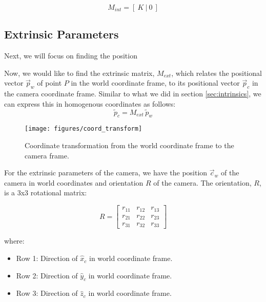 \begin{equation}
    M_{int} = \left[\: K \:\vert\: 0 \:\right]
\end{equation}

\subsection{Extrinsic Parameters} \label{sec:extrinsics}

Next, we will focus on finding the position 

Now, we would like to find the extrinsic matrix, $M_{ext}$, which relates the positional vector $\vec{p}_w$ of point $P$ in the world coordinate frame, to its positional vector $\vec{p}_c$ in the camera coordinate frame. Similar to what we did in section \ref{sec:intrinsics}, we can express this in homogenous coordinates as follows:
\begin{equation} \label{eq:pc}
    \widetilde{p}_c =  M_{ext}\,\widetilde{p}_w
\end{equation}

\begin{figure}[H]
    \centering
    \texttt{[image: figures/coord\_transform]}
    \caption{Coordinate transformation from the world coordinate frame to the camera frame.}
\end{figure}


For the extrinsic parameters of the camera, we have the position $\vec{c}_w$ of the camera in world coordinates and orientation $R$ of the camera. The orientation, $R$, is a 3x3 rotational matrix: 

\begin{equation}
    R = 
    \begin{bmatrix}
        r_{11} & r_{12} & r_{13} \\
        r_{21} & r_{22} & r_{23} \\
        r_{31} & r_{32} & r_{33}
    \end{bmatrix}
\end{equation}

\noindent where:
\begin{itemize}
    \item Row 1: Direction of $\hat{x}_c$ in world coordinate frame.
    \item Row 2: Direction of $\hat{y}_c$ in world coordinate frame.
    \item Row 3: Direction of $\hat{z}_c$ in world coordinate frame.
\end{itemize}

